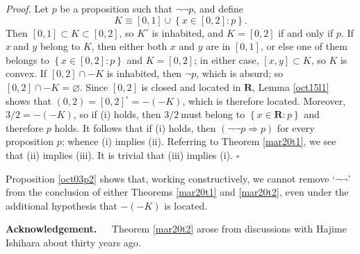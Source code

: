 \documentclass[11pt]{article}%
\newenvironment{proof}[1][Proof]{\noindent\textit{#1.} }{}
\begin{document}
\begin{proof}
Let $p$ be a proposition such that $\lnot\lnot p$, and define%
\[
K\equiv\left[  0,1\right]  \cup\left\{  x\in\left[  0,2\right]  :p\right\}
\text{.}%
\]
Then $\left[  0,1\right]  \subset K\subset\left[  0,2\right]  $, so $K^{\circ
}$ is inhabited, and $K=\left[  0,2\right]  $ if and only if $p$. If $x\ $and
$y$ belong to $K$, then either both $x$ and $y$ are in $\left[  0,1\right]  $,
or else one of them belongs to $\left\{  x\in\left[  0,2\right]  :p\right\}  $
and $K=\left[  0,2\right]  $; in either case, $\left[  x,y\right]  \subset K$,
so $K$ is convex. If $\left[  0,2\right]  \cap-K$ is inhabited, then $\lnot
p$, which is absurd; so $\left[  0,2\right]  \cap-K=\varnothing$. Since
$\left[  0,2\right]  $ is closed and located in $\mathbf{R}$, Lemma
\ref{oct15l1} shows that $\left(  0,2\right)  =\left[  0,2\right]  ^{\circ
}=-(-K)$, which is therefore located. Moreover, $3/2=-(-K)$, so if (i) holds,
then $3/2\ $must belong to $\left\{  x\in\mathbf{R}:p\right\}  $ and therefore
$p$ holds. It follows that if (i) holds, then $(\lnot\lnot p\Rightarrow p)$
for every proposition $p$; whence (i) implies (ii). Referring to Theorem
\ref{mar20t1}, we see that (ii) implies (iii). It is trivial that (iii)
implies (i).%
\hfill
$\square$
\end{proof}

%

\medskip


Proposition \ref{oct03p2} shows that, working constructively, we cannot remove
`$\lnot\lnot$' from the conclusion of either Theorems \ref{mar20t1} and
\ref{mar20t2}, even under the additional hypothesis that $-(-K)$ is located.%

\medskip
%

\bigskip
%

\noindent
\textbf{Acknowledgement. \ \ }Theorem \ref{mar20t2} arose from discussions
with Hajime Ishihara about thirty years ago.%

\bigskip
\end{document}
